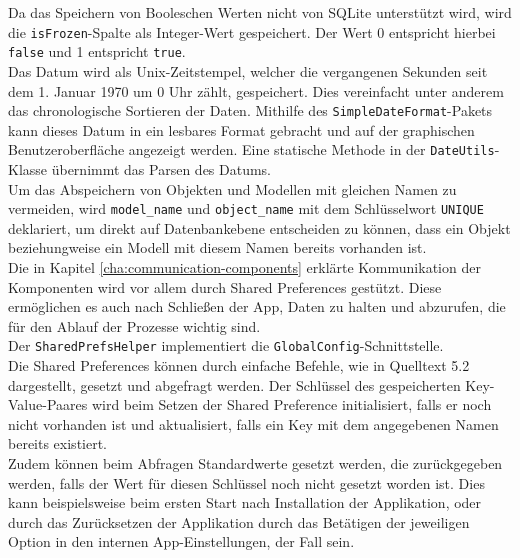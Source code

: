 \documentclass[oneside]{ausarbeitung}
\begin{document}
Da das Speichern von Booleschen Werten nicht von SQLite unterstützt wird, wird die \texttt{isFrozen}-Spalte als Integer-Wert gespeichert. Der Wert 0 entspricht hierbei \texttt{false} und 1 entspricht \texttt{true}.\\
Das Datum wird als Unix-Zeitstempel, welcher die vergangenen Sekunden seit dem 1. Januar 1970 um 0 Uhr zählt, gespeichert. Dies vereinfacht unter anderem das chronologische Sortieren der Daten. Mithilfe des \texttt{SimpleDateFormat}-Pakets kann dieses Datum in ein lesbares Format gebracht und auf der graphischen Benutzeroberfläche angezeigt werden. Eine statische Methode in der \texttt{DateUtils}-Klasse übernimmt das Parsen des Datums.\\
Um das Abspeichern von Objekten und Modellen mit gleichen Namen zu vermeiden, wird \texttt{model\_name} und \texttt{object\_name} mit dem Schlüsselwort \texttt{UNIQUE} deklariert, um direkt auf Datenbankebene entscheiden zu können, dass ein Objekt beziehungweise ein Modell mit diesem Namen bereits vorhanden ist.\\
Die in Kapitel \ref{cha:communication-components} erklärte Kommunikation der Komponenten wird vor allem durch Shared Preferences gestützt. Diese ermöglichen es auch nach Schließen der App, Daten zu halten und abzurufen, die für den Ablauf der Prozesse wichtig sind.\\
Der \texttt{SharedPrefsHelper} implementiert die \texttt{GlobalConfig}-Schnittstelle.\\
Die Shared Preferences können durch einfache Befehle, wie in Quelltext 5.2 dargestellt, gesetzt und abgefragt werden. Der Schlüssel des gespeicherten Key-Value-Paares wird beim Setzen der Shared Preference initialisiert, falls er noch nicht vorhanden ist und aktualisiert, falls ein Key mit dem angegebenen Namen bereits existiert.\\
Zudem können beim Abfragen Standardwerte gesetzt werden, die zurückgegeben werden, falls der Wert für diesen Schlüssel noch nicht gesetzt worden ist. Dies kann beispielsweise beim ersten Start nach Installation der Applikation, oder durch das Zurücksetzen der Applikation durch das Betätigen der jeweiligen Option in den internen App-Einstellungen, der Fall sein.
\end{document}
